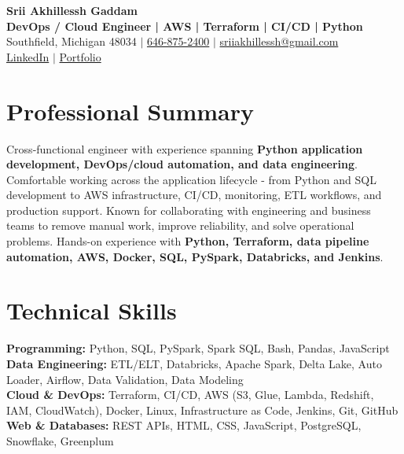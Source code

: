 \documentclass[letterpaper,10pt]{article}
\begin{document}
\fontsize{9.35pt}{10.45pt}\selectfont

\begin{center}
    {\LARGE \textbf{Srii Akhillessh Gaddam}} \\[-1pt]
    \textbf{DevOps / Cloud Engineer | AWS | Terraform | CI/CD | Python} \\[2pt]
    Southfield, Michigan 48034 $|$
    \href{tel:6468752400}{646-875-2400} $|$
    \href{mailto:sriiakhillessh@gmail.com}{sriiakhillessh@gmail.com} \\[1pt]
    \href{https://www.linkedin.com/in/srii-akhiilessh-gaddam-b48668191/}{LinkedIn} $|$
    \href{https://sriiakhillesshg.github.io/portfolio/}{Portfolio}
\end{center}
\vspace{-8pt}

\section{Professional Summary}
\small{Cross-functional engineer with experience spanning \textbf{Python application development, DevOps/cloud automation, and data engineering}. Comfortable working across the application lifecycle - from Python and SQL development to AWS infrastructure, CI/CD, monitoring, ETL workflows, and production support. Known for collaborating with engineering and business teams to remove manual work, improve reliability, and solve operational problems. Hands-on experience with \textbf{Python, Terraform, data pipeline automation, AWS, Docker, SQL, PySpark, Databricks, and Jenkins}.}

\section{Technical Skills}
\small{
\textbf{Programming:} Python, SQL, PySpark, Spark SQL, Bash, Pandas, JavaScript \\
\textbf{Data Engineering:} ETL/ELT, Databricks, Apache Spark, Delta Lake, Auto Loader, Airflow, Data Validation, Data Modeling \\
\textbf{Cloud \& DevOps:} Terraform, CI/CD, AWS (S3, Glue, Lambda, Redshift, IAM, CloudWatch), Docker, Linux, Infrastructure as Code, Jenkins, Git, GitHub \\
\textbf{Web \& Databases:} REST APIs, HTML, CSS, JavaScript, PostgreSQL, Snowflake, Greenplum
}
\end{document}
